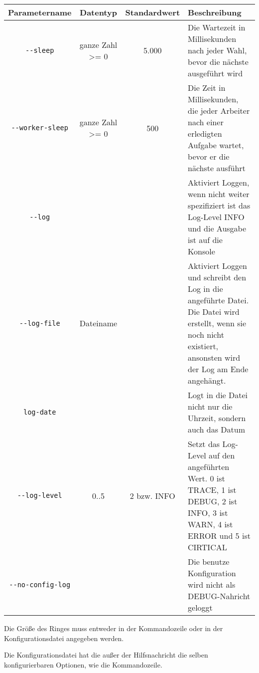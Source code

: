 \begin{center}
\begin{tabular}{ | c | c | c | p{3cm} | }
\hline
\textbf{Parametername} & \textbf{Datentyp} & \textbf{Standardwert} & \textbf{Beschreibung} \\
\hline
 \verb|--sleep| & ganze Zahl >= 0 & 5.000 & Die Wartezeit in Millisekunden nach jeder Wahl, bevor die nächste ausgeführt wird \\ \hline
 \verb|--worker-sleep| & ganze Zahl >= 0 & 500 & Die Zeit in Millisekunden, die jeder Arbeiter nach einer erledigten Aufgabe wartet, 
                                                    bevor er die nächste ausführt \\ \hline
 \verb|--log| & & & Aktiviert Loggen, wenn nicht weiter spezifiziert ist das Log-Level INFO und die Ausgabe ist auf die Konsole \\ \hline
 \verb|--log-file| & Dateiname & & Aktiviert Loggen und schreibt den Log in die angeführte Datei. 
                                    Die Datei wird erstellt, wenn sie noch nicht existiert, ansonsten wird der Log am Ende angehängt. \\ \hline
 \verb|log-date| & & & Logt in die Datei nicht nur die Uhrzeit, sondern auch das Datum \\ \hline
 \verb|--log-level| & 0..5 & 2 bzw. INFO & Setzt das Log-Level auf den angeführten Wert. 
                                            0 ist TRACE, 1 ist DEBUG, 2 ist INFO, 3 ist WARN, 4 ist ERROR und 5 ist CIRTICAL \\ \hline
 \verb|--no-config-log| & & & Die benutze Konfiguration wird nicht als DEBUG-Nahricht geloggt \\ \hline
\end{tabular}
\end{center}

Die Größe des Ringes muss entweder in der Kommandozeile oder in der Konfigurationsdatei angegeben werden.

Die Konfigurationsdatei hat die außer der Hilfsnachricht die selben konfigurierbaren Optionen, wie die Kommandozeile.

